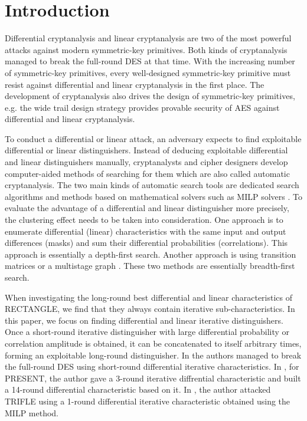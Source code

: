 \section{Introduction}

Differential cryptanalysis \cite{biham1991differential} and linear cryptanalysis \cite{matsui1993linear} are two of the most powerful attacks against modern symmetric-key primitives. Both kinds of cryptanalysis managed to break the full-round DES at that time. With the increasing number of symmetric-key primitives, every well-designed symmetric-key primitive must resist against differential and linear cryptanalysis in the first place. The development of cryptanalysis also drives the design of symmetric-key primitives, e.g. the wide trail design strategy provides provable security of AES \cite{daemen2002design} against differential and linear cryptanalysis. 

To conduct a differential or linear attack, an adversary expects to find exploitable differential or linear distinguishers. Instead of deducing  exploitable differential and linear distinguishers manually, cryptanalysts and cipher designers develop computer-aided methods of searching for them which are also called automatic cryptanalysis. The two main kinds of automatic search tools are dedicated search algorithms \cite{matsui1994correlation,ohta1995improving,aoki1997best,abdelraheem2012estimating,bao2014speeding,dobraunig2015heuristic} and methods based on mathematical solvers such as MILP solvers \cite{mouha2011differential,sun2013automatic,sun2014automatic,sun2014towards,zhou2019improving}. To evaluate the advantage of a differential and linear distinguisher more precisely, the clustering effect needs to be taken into consideration. One approach is to enumerate differential (linear) characteristics with the same input and output differences (masks) and sum their differential probabilities (correlations). This approach is essentially a depth-first search. Another approach is using transition matrices \cite{abdelraheem2012estimating} or a multistage graph \cite{EPRINT:HalVej18}. These two methods are essentially breadth-first search. 

When investigating the long-round best differential and linear characteristics of RECTANGLE, we find that they always contain iterative sub-characteristics. In this paper, we focus on finding differential and linear iterative distinguishers. Once a short-round iterative distinguisher with large differential probability or correlation amplitude is obtained, it can be concatenated to itself arbitrary times, forming an exploitable long-round distinguisher. In \cite{biham1991differential,biham1992differential,knudsen1992iterative} the authors managed to break the full-round DES using short-round differential iterative characteristics. In \cite{wang2008differential}, for PRESENT, the author gave a 3-round iterative diffrential characteristic and built a 14-round differential characteristic based on it. In \cite{liu2019iterative}, the author attacked TRIFLE using a 1-round differential iterative characteristic obtained using the MILP method. 

